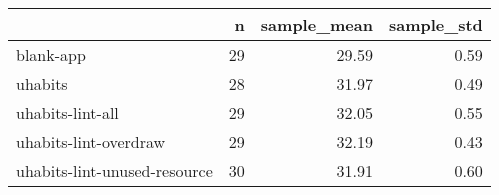 \begin{tabular}{lrrr}
\toprule
{} &   n &  sample\_mean &  sample\_std \\
\midrule
blank-app                    &  29 &        29.59 &        0.59 \\
uhabits                      &  28 &        31.97 &        0.49 \\
uhabits-lint-all             &  29 &        32.05 &        0.55 \\
uhabits-lint-overdraw        &  29 &        32.19 &        0.43 \\
uhabits-lint-unused-resource &  30 &        31.91 &        0.60 \\
\bottomrule
\end{tabular}
